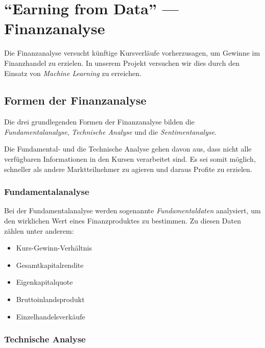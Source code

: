 \section{\enquote{Earning from Data} --- Finanzanalyse}
\author{Dennis Kempf, Moritz Hollenberg, Patrice Becker}
\label{sec:FinanzenIntro}

Die Finanzanalyse versucht künftige Kursverläufe vorherzusagen, um Gewinne im Finanzhandel zu erzielen. In unserem Projekt versuchen wir dies durch den Einsatz von \emph{Machine Learning} zu erreichen.

\subsection{Formen der Finanzanalyse}
\author{Dennis Kempf}
\label{ssec:FinanzanalyseFormenIntro}

Die drei grundlegenden Formen der Finanzanalyse bilden die \emph{Fundamentalanalyse}, \emph{Technische Analyse} und die \emph{Sentimentanalyse}. 

Die Fundamental- und die Technische Analyse gehen davon aus, dass nicht alle verfügbaren Informationen in den Kursen verarbeitet sind. Es sei somit möglich, schneller als andere Marktteilnehmer zu agieren und daraus Profite zu erzielen.

\subsubsection{Fundamentalanalyse}
\author{Dennis Kempf}
\label{sssec:Fundamentalanalyse}

Bei der Fundamentalanalyse werden sogenannte \emph{Fundamentaldaten} analysiert, um den wirklichen Wert eines Finanzproduktes zu bestimmen. Zu diesen Daten zählen unter anderem:\\ 

\begin{itemize}
	\item Kurs-Gewinn-Verhältnis
	\item Gesamtkapitalrendite
	\item Eigenkapitalquote
	\item Bruttoinlandsprodukt
	\item Einzelhandelsverkäufe
\end{itemize}

\subsubsection{Technische Analyse}
\author{Dennis Kempf}
\label{sssec:TechnischeAnalyse}

